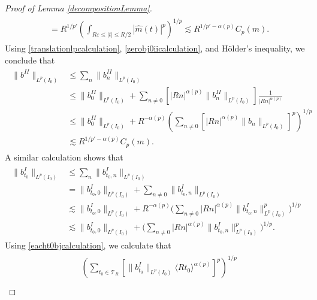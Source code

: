 \begin{proof} [Proof of Lemma \ref{decompositionLemma}]
\begin{align}
\begin{split}
        &= R^{1/p'} \left( \int_{R \varepsilon \leq |t| \leq R/2} |\widehat{m}(t)|^p \right)^{1/p} \lesssim R^{1/p' - \alpha(p)} C_p(m).
    \end{split}
    \end{align}
    Using \eqref{translationlpcalculation}, \eqref{zerobj0iicalculation}, and H\"{o}lder's inequality, we conclude that
    \begin{align}
    \begin{split}
        \|  b^{II} \|_{L^p(I_0)} &\leq \sum\nolimits_n \| b_{n}^{II} \|_{L^p(I_0)}\\
        &\leq \| b_{0}^{II} \|_{L^p(I_0)} + \sum\nolimits_{n \neq 0} \left[ |R n|^{\alpha(p)} \| b_{n}^{II} \|_{L^p(I_0)} \right] \frac{1}{|R n|^{\alpha(p)}}\\
        &\leq \| b_{0}^{II} \|_{L^p(I_0)} + R^{-\alpha(p)} \left( \sum\nolimits_{n \neq 0} \left[ |R n|^{\alpha(p)} \| b_{n} \|_{L^p(I_0)} \right]^p \right)^{1/p}\\ %
        &\lesssim R^{1/p' - \alpha(p)} C_p(m).
    \end{split}
    \end{align}
    A similar calculation shows that
    \begin{align} \label{eacht0bjcalculation}
    \begin{split}
        \| b_{t_0}^I \|_{L^p(I_0)} &\leq \sum\nolimits_n \| b_{t_0,n}^I \|_{L^p(I_0)}\\
        &= \| b_{t_0,0}^I \|_{L^p(I_0)} + \sum\nolimits_{n \neq 0} \| b_{t_0,n}^I \|_{L^p(I_0)}\\
        &\lesssim \| b_{t_0,0}^I \|_{L^p(I_0)} + R^{-\alpha(p)} \Big( \sum\nolimits_{n \neq 0} |R n|^{\alpha(p)} \| b_{t_0,n}^I \|_{L^p(I_0)}^p \Big)^{1/p}\\
        &\lesssim \| b_{t_0,0}^I \|_{L^p(I_0)} + \Big( \sum\nolimits_{n \neq 0} |R n|^{\alpha(p)} \| b_{t_0,n}^I \|_{L^p(I_0)}^p \Big)^{1/p}.
    \end{split}
    \end{align}
    Using \eqref{eacht0bjcalculation}, we calculate that
    \begin{align} \label{bjt0Icalculation}
    \begin{split}
        &\left( \sum_{t_0 \in \mathcal{T}_R} \left[ \| b_{t_0}^I \|_{L^p(I_0)} \langle R t_0 \rangle^{\alpha(p)} \right]^p \right)^{1/p}\\

\end{split}
\end{align}
\end{proof}

